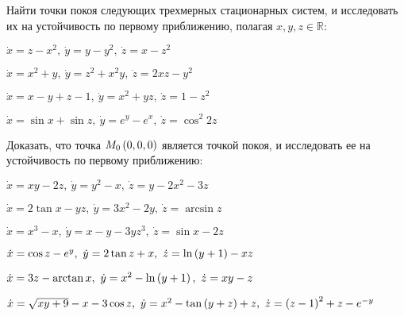 	Найти точки покоя следующих трехмерных стационарных систем, и исследовать их на устойчивость по первому приближению, полагая $x, y, z \in \mathbb{R}$:
	\begin{enumtasks}

		\label{stability_zeros:firstapprox3d}
		\item \( \dot{x} = z - x^2, ~ \dot{y} = y - y^2, ~ \dot{z} = x - z^2 \) %
		\item \( \dot{x} = x^2 + y, ~ \dot{y} = z^2 + x^2 y, ~ \dot{z} = 2xz - y^2 \) %
		\item \( \dot{x} = x - y + z - 1, ~ \dot{y} = x^2 + yz, ~ \dot{z} = 1 - z^2 \) %
		\item \( \dot{x} = \sin{x} + \sin{z}, ~ \dot{y} = e^y - e^x, ~ \dot{z} = \cos^2{2z} \) %

	\end{enumtasks}

	Доказать, что точка $M_0 \left( 0, 0, 0 \right)$ является точкой покоя, и исследовать ее на устойчивость по первому приближению:
	\begin{enumtasks}

		\label{stability_zeros:firstapprox3d_zero}
		\item \( \dot{x} = xy - 2z, ~ \dot{y} = y^2 - x, ~ \dot{z} = y - 2x^2 - 3z \) %
		\item \( \dot{x} = 2 \tan{x} - yz, ~ \dot{y} = 3x^2 - 2y, ~ \dot{z} = \arcsin{z} \) %
		\item \( \dot{x} = x^3 - x, ~ \dot{y} = x - y - 3yz^3, ~ \dot{z} = \sin{x} - 2z \) %
		\item \( \dot{x} = \cos{z} - e^y, ~ \dot{y} = 2\tan{z} + x, ~ \dot{z} = \ln\left( y+1 \right) - xz \) %
		\item \( \dot{x} = 3z - \arctan{x}, ~ \dot{y} = x^2 - \ln\left( y+1 \right), ~ \dot{z} = xy - z \) %
		\item \( \dot{x} = \sqrt{xy + 9} - x - 3\cos{z}, ~ \dot{y} = x^2 - \tan\left( y + z \right) + z, ~ \dot{z} = \left( z - 1 \right)^2 + z - e^{-y} \)  %

	\end{enumtasks}
